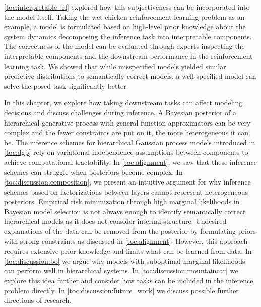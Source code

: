 \cref{toc:interpretable_rl} explored how this subjectiveness can be incorporated into the model itself.
Taking the wet-chicken reinforcement learning problem as an example, a model is formulated based on high-level prior knowledge about the system dynamics decomposing the inference task into interpretable components.
The correctness of the model can be evaluated through experts inspecting the interpretable components and the downstream performance in the reinforcement learning task.
We showed that while misspecified models yielded similar predictive distributions to semantically correct models, a well-specified model can solve the posed task significantly better.

In this chapter, we explore how taking downstream tasks can affect modeling decisions and discuss challenges during inference.
A Bayesian posterior of a hierarchical generative process with general function approximators can be very complex and the fewer constraints are put on it, the more heterogeneous it can be.
The inference schemes for hierarchical Gaussian process models introduced in \cref{toc:dgp} rely on variational independence assumptions between components to achieve computational tractability.
In \cref{toc:alignment}, we saw that these inference schemes can struggle when posteriors become complex.
In \cref{toc:discussion:composition}, we present an intuitive argument for why inference schemes based on factorizations between layers cannot represent heterogeneous posteriors.
Empirical risk minimization through high marginal likelihoods in Bayesian model selection is not always enough to identify semantically correct hierarchical models as it does not consider internal structure.
Undesired explanations of the data can be removed from the posterior by formulating priors with strong constraints as discussed in \cref{toc:alignment}.
However, this approach requires extensive prior knowledge and limits what can be learned from data.
In \cref{toc:discussion:bo} we argue why models with suboptimal marginal likelihoods can perform well in hierarchical systems.
In \cref{toc:discussion:mountaincar} we explore this idea further and consider how tasks can be included in the inference problem directly.
In \cref{toc:discussion:future_work} we discuss possible further directions of research.


